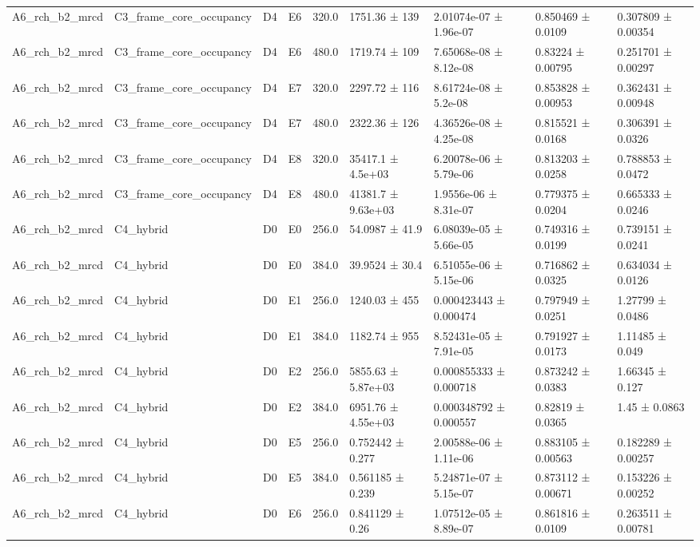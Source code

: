 \begin{table}
\begin{tabular}{lllllllll}
A6\_rch\_b2\_mrcd & C3\_frame\_core\_occupancy & D4 & E6 & 320.0 & 1751.36 ± 139 & 2.01074e-07 ± 1.96e-07 & 0.850469 ± 0.0109 & 0.307809 ± 0.00354 \\
A6\_rch\_b2\_mrcd & C3\_frame\_core\_occupancy & D4 & E6 & 480.0 & 1719.74 ± 109 & 7.65068e-08 ± 8.12e-08 & 0.83224 ± 0.00795 & 0.251701 ± 0.00297 \\
A6\_rch\_b2\_mrcd & C3\_frame\_core\_occupancy & D4 & E7 & 320.0 & 2297.72 ± 116 & 8.61724e-08 ± 5.2e-08 & 0.853828 ± 0.00953 & 0.362431 ± 0.00948 \\
A6\_rch\_b2\_mrcd & C3\_frame\_core\_occupancy & D4 & E7 & 480.0 & 2322.36 ± 126 & 4.36526e-08 ± 4.25e-08 & 0.815521 ± 0.0168 & 0.306391 ± 0.0326 \\
A6\_rch\_b2\_mrcd & C3\_frame\_core\_occupancy & D4 & E8 & 320.0 & 35417.1 ± 4.5e+03 & 6.20078e-06 ± 5.79e-06 & 0.813203 ± 0.0258 & 0.788853 ± 0.0472 \\
A6\_rch\_b2\_mrcd & C3\_frame\_core\_occupancy & D4 & E8 & 480.0 & 41381.7 ± 9.63e+03 & 1.9556e-06 ± 8.31e-07 & 0.779375 ± 0.0204 & 0.665333 ± 0.0246 \\
A6\_rch\_b2\_mrcd & C4\_hybrid & D0 & E0 & 256.0 & 54.0987 ± 41.9 & 6.08039e-05 ± 5.66e-05 & 0.749316 ± 0.0199 & 0.739151 ± 0.0241 \\
A6\_rch\_b2\_mrcd & C4\_hybrid & D0 & E0 & 384.0 & 39.9524 ± 30.4 & 6.51055e-06 ± 5.15e-06 & 0.716862 ± 0.0325 & 0.634034 ± 0.0126 \\
A6\_rch\_b2\_mrcd & C4\_hybrid & D0 & E1 & 256.0 & 1240.03 ± 455 & 0.000423443 ± 0.000474 & 0.797949 ± 0.0251 & 1.27799 ± 0.0486 \\
A6\_rch\_b2\_mrcd & C4\_hybrid & D0 & E1 & 384.0 & 1182.74 ± 955 & 8.52431e-05 ± 7.91e-05 & 0.791927 ± 0.0173 & 1.11485 ± 0.049 \\
A6\_rch\_b2\_mrcd & C4\_hybrid & D0 & E2 & 256.0 & 5855.63 ± 5.87e+03 & 0.000855333 ± 0.000718 & 0.873242 ± 0.0383 & 1.66345 ± 0.127 \\
A6\_rch\_b2\_mrcd & C4\_hybrid & D0 & E2 & 384.0 & 6951.76 ± 4.55e+03 & 0.000348792 ± 0.000557 & 0.82819 ± 0.0365 & 1.45 ± 0.0863 \\
A6\_rch\_b2\_mrcd & C4\_hybrid & D0 & E5 & 256.0 & 0.752442 ± 0.277 & 2.00588e-06 ± 1.11e-06 & 0.883105 ± 0.00563 & 0.182289 ± 0.00257 \\
A6\_rch\_b2\_mrcd & C4\_hybrid & D0 & E5 & 384.0 & 0.561185 ± 0.239 & 5.24871e-07 ± 5.15e-07 & 0.873112 ± 0.00671 & 0.153226 ± 0.00252 \\
A6\_rch\_b2\_mrcd & C4\_hybrid & D0 & E6 & 256.0 & 0.841129 ± 0.26 & 1.07512e-05 ± 8.89e-07 & 0.861816 ± 0.0109 & 0.263511 ± 0.00781 \\

\end{tabular}
\end{table}

